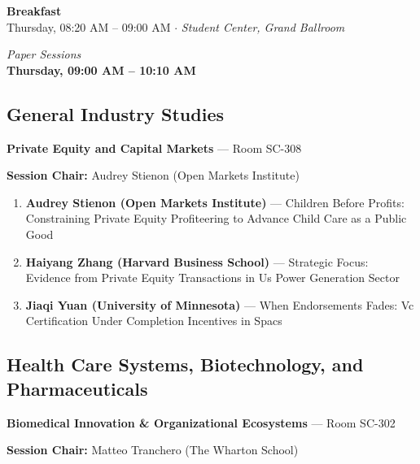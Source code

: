 \documentclass[
  10pt,
  letterpaper,
  DIV=11,
  numbers=noendperiod]{scrartcl}
\begin{document}
\begin{center}
\colorbox{event!15}{\parbox{0.9\linewidth}{\centering
  \textcolor{event}{\large\textbf{Breakfast}}\\[2pt]
  {\small Thursday, 08:20 AM – 09:00 AM $\cdot$ \textit{Student Center, Grand Ballroom}}
}}
\end{center}

\vspace{1em}


\begin{center}
\normalsize\textit{Paper Sessions}\\[0.3em]
\Large\textbf{Thursday, 09:00 AM – 10:10 AM}
\end{center}

\subsection{\texorpdfstring{\textcolor{gis}{General Industry Studies}}{}}\label{section-21}

\textbf{Private Equity and Capital Markets} --- Room SC-308

\textbf{Session Chair:} Audrey Stienon (Open Markets Institute)

\begin{enumerate}
\def\labelenumi{\arabic{enumi}.}
\item
  \textbf{Audrey Stienon (Open Markets Institute)} --- Children Before
  Profits: Constraining Private Equity Profiteering to Advance Child
  Care as a Public Good
\item
  \textbf{Haiyang Zhang (Harvard Business School)} --- Strategic Focus:
  Evidence from Private Equity Transactions in Us Power Generation
  Sector
\item
  \textbf{Jiaqi Yuan (University of Minnesota)} --- When Endorsements
  Fades: Vc Certification Under Completion Incentives in Spacs
\end{enumerate}

\subsection{\texorpdfstring{\textcolor{health}{Health Care Systems, Biotechnology, and Pharmaceuticals}}{}}\label{section-22}

\textbf{Biomedical Innovation \& Organizational Ecosystems} --- Room
SC-302

\textbf{Session Chair:} Matteo Tranchero (The Wharton School)
\end{document}
